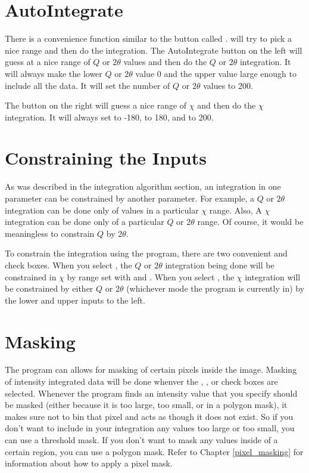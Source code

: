 \section{AutoIntegrate}

There is a convenience function similar to the
 button called . 
 will try to pick a nice range 
and then do the integration. The AutoIntegrate button 
on the left will guess at a nice range of $Q$ 
or $2\theta$ values and then do the $Q$ or
$2\theta$ integration.
It will always make the lower $Q$ or $2\theta$ 
value 0 and the upper value large enough
to include all the data.
It will set the number of $Q$ or $2\theta$ values to
200.

The  button on the right 
will guess a nice range of $\chi$ and then
do the $\chi$ integration. It will always 
set  to -180,  to
180, and  to 200.

\section{Constraining the Inputs}

As was described in the integration algorithm 
section, an integration in one parameter can 
be constrained by another parameter. For example,
a $Q$ or $2\theta$ integration can be done only 
of values in a particular $\chi$ range. Also,
A $\chi$ integration can be done only of a
particular $Q$ or $2\theta$ range. Of course,
it would be meaningless to constrain $Q$ by
$2\theta$.

To constrain the integration using the program,
there are two convenient 
 and 
 check boxes.
When you select
, the
$Q$ or $2\theta$ integration being done
will be constrained in $\chi$ by range
set with  and .
When you select
, the
$\chi$ integration will be constrained by
either $Q$ or $2\theta$ (whichever mode the
program is currently in) by the lower and
upper inputs to the left.

\section{Masking}

The program can allows for masking of certain
pixels inside the image. 
Masking of intensity integrated data will be done
whenver the
, ,
or  check boxes are selected.
Whenever the program finds an intensity value
that you specify should be masked (either because it 
is too large, too small, or in a polygon mask), it makes
sure not to bin that pixel and acts as though
it does not exist. So if you don't want to include
in your integration any values too large or too
small, you can use a threshold mask. If you
don't want to mask any values inside of a certain
region, you can use a polygon mask. 
Refer to Chapter \ref{pixel_masking} for information 
about how to apply a pixel mask.

